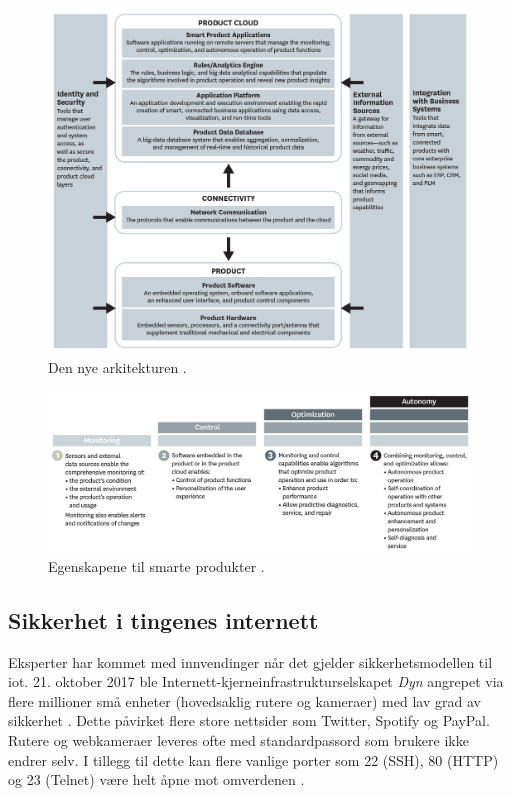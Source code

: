 \begin{figure}
\includegraphics[width=1.0\textwidth,center]{fig/harvard_technology}
\caption{Den nye arkitekturen \citep{iot_harvard_smart}.}
\label{fig:iot_harvard_smart}
\end{figure}

\begin{figure}
\includegraphics[width=1.0\textwidth,center]{fig/harvard_capabilities}
\caption{Egenskapene til smarte produkter \citep{iot_harvard_smart}.}
\label{fig:iot_harvard_capabilities}
\end{figure}


\subsection{Sikkerhet i tingenes internett}
Eksperter har kommet med innvendinger når det gjelder sikkerhetsmodellen til \gls{iot}.
21. oktober 2017 ble Internett-kjerneinfrastrukturselskapet \textit{Dyn} angrepet via flere millioner
små enheter (hovedsaklig rutere og kameraer) med lav grad av sikkerhet \citep{iot_attack_ddos}.
Dette påvirket flere store nettsider som Twitter, Spotify og PayPal. Rutere og webkameraer leveres
ofte med standardpassord som brukere ikke endrer selv. I tillegg til dette kan flere vanlige
porter som 22 (SSH), 80 (HTTP) og 23 (Telnet) være helt åpne mot omverdenen \citep{iot_mirai_botnet}.

